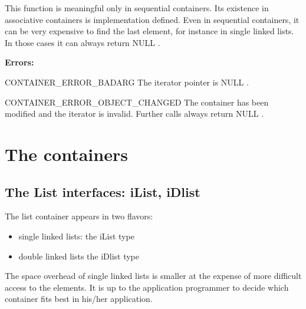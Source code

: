 \documentclass[12pt,a4paper]{memoir} %
\newcommand{\apierrors}{%
\par \noindent \textbf{Errors:}\par\noindent
}
\newcommand{\doerror}[1]{%
\par\noindent
{\footnotesize CONTAINER\_ERROR\_#1}
}
\newcommand{\Null}{
{\footnotesize NULL}
}
\begin{document}
This function is meaningful only in sequential containers. Its existence in associative containers is implementation defined. Even in sequential containers, it can be very expensive to find the last element, for instance in single linked lists. In those cases it can always return\Null.
\apierrors
\doerror{BADARG} The iterator pointer is\Null.
\doerror{OBJECT\_CHANGED} The container has been modified and the iterator is invalid. Further calls always return\Null.
\chapter{The containers}
\section{The List interfaces: iList, iDlist}
The list container appears in two flavors: 
\begin{itemize}
\item
single linked lists: the iList type
\item
double linked lists the iDlist type
\end{itemize}
The space overhead of single linked lists is smaller at the expense of more difficult access to the elements. It is up to the application programmer to decide which container fits best in his/her application.
\end{document}
